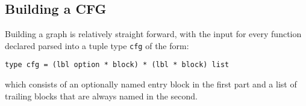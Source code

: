 \documentclass{article}
\begin{document}












\subsection{Building a CFG}




Building a graph is relatively straight forward, with the input for every function declared parsed into a tuple type \texttt{cfg}  of the form:
\begin{center}
\begin{verbatim}
type cfg = (lbl option * block) * (lbl * block) list
\end{verbatim}
\end{center}
which consists of an optionally named entry block in the first part and a list of trailing blocks that are always named in the second.
\end{document}
